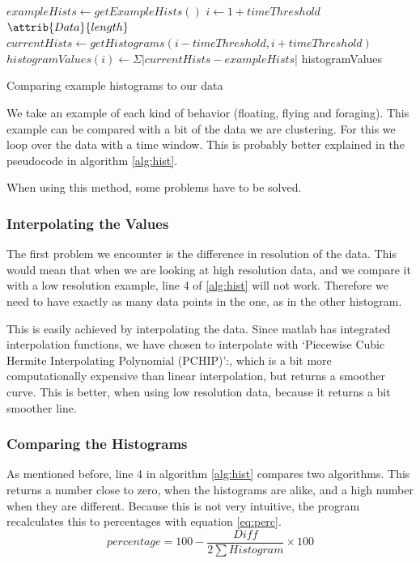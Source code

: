 \begin{algorithm}
\begin{codebox}
\li $exampleHists \gets getExampleHists()$
\li \For $i \gets 1 + timeThreshold$ \To $\attrib{Data}{length}$ 
\li \Do
    $currentHists \gets getHistograms(i-timeThreshold, i+timeThreshold)$
    \li $histogramValues(i) \gets \Sigma \left| currentHists - exampleHists \right|$
\End
\li \Return histogramValues
\end{codebox}
\caption{Comparing example histograms to our data}
\label{alg:hist}
\end{algorithm}

We take an example of each kind of behavior (floating, flying and foraging).
This example can be compared with a bit of the data we are
clustering. For this we loop over the data with a time window. This is probably
better explained in the pseudocode in algorithm \ref{alg:hist}.

When using this method, some problems have to be solved.

\subsubsection{Interpolating the Values}
The first problem we encounter is the difference in resolution of the data. This
would mean that when we are looking at high resolution data, and we compare it
with a low resolution example, line 4 of \ref{alg:hist} will not work. Therefore
we need to have exactly as many data points in the one, as in the other
histogram. 

This is easily achieved by interpolating the data. Since matlab has integrated
interpolation functions, we have chosen to interpolate with `Piecewise Cubic
Hermite Interpolating Polynomial (PCHIP)':, which is a bit more computationally
expensive than linear interpolation, but returns a smoother curve. This is
better, when using low resolution data, because it returns a bit smoother line.

\subsubsection{Comparing the Histograms}
As mentioned before, line 4 in algorithm \ref{alg:hist} compares two algorithms.
This returns a number close to zero, when the histograms are alike, and a high
number when they are different. Because this is not very intuitive, the program
recalculates this to percentages with equation \ref{eq:perc}.
\begin{equation}
\label{eq:perc}
percentage = 100 - \frac{Diff}{2 \sum Histogram} \times 100
\end{equation}


